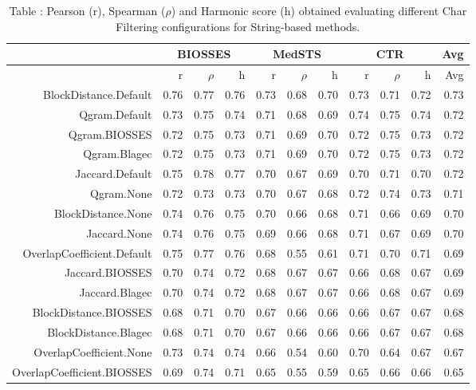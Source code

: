 \begin{table}[!h]
\centering
\caption{Table \label{table:Preprocessing_charfiltering_StringMethods}: Pearson (r), Spearman ($\rho$) and Harmonic score (h) obtained evaluating different Char Filtering configurations for String-based methods.} 
\begingroup\tiny
\begin{tabular}{rrrrrrrrrrr}
  \hline \multicolumn{1}{c}{ } & \multicolumn{3}{c}{BIOSSES} & \multicolumn{3}{c}{MedSTS} & \multicolumn{3}{c}{CTR} & \multicolumn{1}{c}{Avg} \\  \hline
 & r & $\rho$ & h & r & $\rho$ & h & r & $\rho$ & h & Avg \\ 
  \hline
BlockDistance.Default & 0.76 & 0.77 & 0.76 & 0.73 & 0.68 & 0.70 & 0.73 & 0.71 & 0.72 & 0.73 \\ 
  Qgram.Default & 0.73 & 0.75 & 0.74 & 0.71 & 0.68 & 0.69 & 0.74 & 0.75 & 0.74 & 0.72 \\ 
  Qgram.BIOSSES & 0.72 & 0.75 & 0.73 & 0.71 & 0.69 & 0.70 & 0.72 & 0.75 & 0.73 & 0.72 \\ 
  Qgram.Blagec & 0.72 & 0.75 & 0.73 & 0.71 & 0.69 & 0.70 & 0.72 & 0.75 & 0.73 & 0.72 \\ 
  Jaccard.Default & 0.75 & 0.78 & 0.77 & 0.70 & 0.67 & 0.69 & 0.70 & 0.71 & 0.70 & 0.72 \\ 
  Qgram.None & 0.72 & 0.73 & 0.73 & 0.70 & 0.67 & 0.68 & 0.72 & 0.74 & 0.73 & 0.71 \\ 
  BlockDistance.None & 0.74 & 0.76 & 0.75 & 0.70 & 0.66 & 0.68 & 0.71 & 0.66 & 0.69 & 0.70 \\ 
  Jaccard.None & 0.74 & 0.76 & 0.75 & 0.69 & 0.66 & 0.68 & 0.71 & 0.67 & 0.69 & 0.70 \\ 
  OverlapCoefficient.Default & 0.75 & 0.77 & 0.76 & 0.68 & 0.55 & 0.61 & 0.71 & 0.70 & 0.71 & 0.69 \\ 
  Jaccard.BIOSSES & 0.70 & 0.74 & 0.72 & 0.68 & 0.67 & 0.67 & 0.66 & 0.68 & 0.67 & 0.69 \\ 
  Jaccard.Blagec & 0.70 & 0.74 & 0.72 & 0.68 & 0.67 & 0.67 & 0.66 & 0.68 & 0.67 & 0.69 \\ 
  BlockDistance.BIOSSES & 0.68 & 0.71 & 0.70 & 0.67 & 0.66 & 0.66 & 0.66 & 0.67 & 0.67 & 0.68 \\ 
  BlockDistance.Blagec & 0.68 & 0.71 & 0.70 & 0.67 & 0.66 & 0.66 & 0.66 & 0.67 & 0.67 & 0.68 \\ 
  OverlapCoefficient.None & 0.73 & 0.74 & 0.74 & 0.66 & 0.54 & 0.60 & 0.70 & 0.64 & 0.67 & 0.67 \\ 
  OverlapCoefficient.BIOSSES & 0.69 & 0.74 & 0.71 & 0.65 & 0.55 & 0.59 & 0.65 & 0.66 & 0.66 & 0.65 \\ 

\end{tabular}
\end{table}
